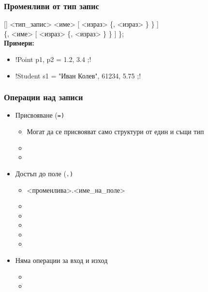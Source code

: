\documentclass[alsotrans]{beamerswitch}
\begin{document}
\begin{frame}[fragile]
  \frametitle{Променливи от тип запис}

  [] <тип\_запис> <име> [ \tta{= \{} <израз> \{\tta, <израз> \} \tta\} ]\\
  \hspace{20ex} \{\tta, <име> [ \tta{= \{} <израз> \{\tta, <израз> \} \tta\} ] \}\tta;\\[2em]
  \pause
  \textbf{Примери:}
  \begin{itemize}[<+->]
  \item \lst!Point p1, p2 = { 1.2, 3.4 };!
  \item \lst!Student s1 = { "Иван Колев", 61234, 5.75 };!
  \end{itemize}
\end{frame}

\begin{frame}
  \frametitle{Операции над записи}

  \begin{itemize}[<+->]
  \item Присвояване (\tt=)
    \begin{itemize}
    \item Могат да се присвояват само структури от един и същи тип
    \item {}
    \item {}
    \end{itemize}
  \item Достъп до поле (\tt.)
    \begin{itemize}
    \item{} <променлива>\tta.<име\_на\_поле>
    \item {}
    \item {}
    \item {}
    \item {}
    \item {}
    \end{itemize}
  \item Няма операции за вход и изход
    \begin{itemize}
    \item {}
    \item {}
    \end{itemize}
  \end{itemize}
\end{frame}
\end{document}
